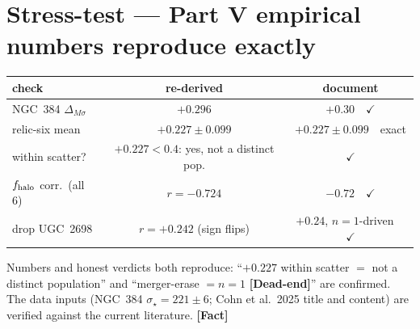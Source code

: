 \documentclass[11pt]{article}
\newcommand{\Fact}{\textbf{\textcolor{green!45!black}{[Fact]}}}
\newcommand{\Dead}{\textbf{\textcolor{red!65!black}{[Dead-end]}}}
\begin{document}
\section{Stress-test --- Part V empirical numbers reproduce exactly}
\begin{center}\small
\begin{tabular}{@{}lcc@{}}
\toprule
check & re-derived & document \\
\midrule
NGC~384 $\Delta_{M\sigma}$ & $+0.296$ & $+0.30$\ \ $\checkmark$ \\
relic-six mean & $+0.227\pm0.099$ & $+0.227\pm0.099$\ \ exact \\
within scatter? & $+0.227<0.4$: yes, not a distinct pop. & $\checkmark$ \\
$f_{\rm halo}$ corr.\ (all 6) & $r=-0.724$ & $-0.72$\ \ $\checkmark$ \\
drop UGC~2698 & $r=+0.242$ (sign flips) & $+0.24$, $n\!=\!1$-driven\ \ $\checkmark$ \\
\bottomrule
\end{tabular}
\end{center}
Numbers and honest verdicts both reproduce: ``$+0.227$ within scatter $=$ not a distinct population'' and ``merger-erase $=n\!=\!1$ \Dead'' are confirmed. The data inputs (NGC~384 $\sigma_\star=221\pm6$; Cohn et al.\ 2025 title and content) are verified against the current literature. \Fact
\end{document}
